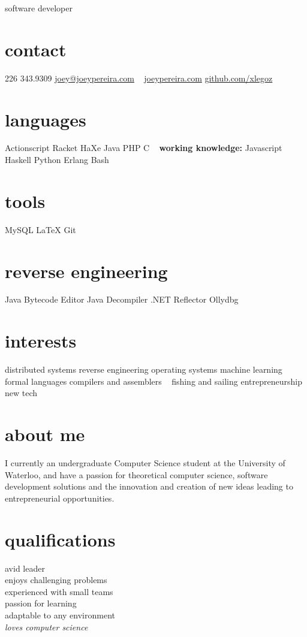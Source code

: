 \documentclass[]{friggeri-cv}
\begin{document}
       {software developer}

\begin{aside}
  \section{contact}
    226 343.9309
    \href{mailto:joey@joeypereira.com}{joey@joeypereira.com}
    ~
    \href{http://joeypereira.com}{joeypereira.com}
    \href{http://www.github.com/xlegoz}{github.com/xlegoz}
  \section{languages}
	Actionscript
	Racket
	HaXe
	Java
	PHP
	C
	~
	\textbf{working knowledge:}
	Javascript
	Haskell
	Python
	Erlang
	Bash	
  \section{tools}
    MySQL
    \LaTeX
	Git
  \section{reverse engineering}
  	Java Bytecode Editor
  	Java Decompiler
  	.NET Reflector
  	Ollydbg
  \section{interests}
  	distributed systems
  	reverse engineering
  	operating systems
  	machine learning
  	formal languages
  	compilers and assemblers
  	~
  	fishing and sailing
  	entrepreneurship
  	new tech
\end{aside}


\section{about me}
I currently an undergraduate Computer Science student at the University of Waterloo, and have a passion for theoretical computer science, software development solutions and the innovation and creation of new ideas leading to entrepreneurial opportunities.
\section{qualifications}
\begin{multicols}{3}
 avid leader \\ enjoys challenging problems \\ experienced with small teams \\ passion for learning \\ adaptable to any environment \\ \em{loves} computer science
\end{multicols}
\end{document}
